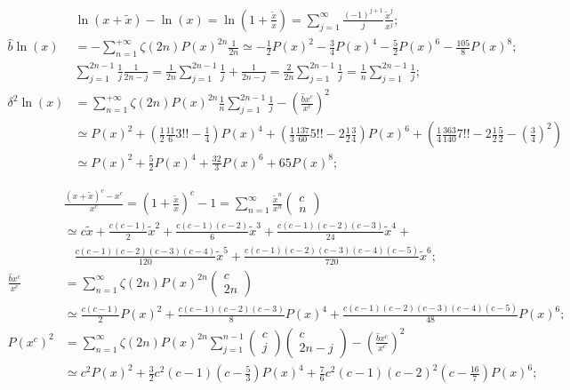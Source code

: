\documentclass[twoside]{article}
\numberwithin{equation}{section}
\newcommand{\eqspace}{\;\;\;}
\begin{document}
\begin{align*}
& \ln(x + \tilde{x}) - \ln(x) = \ln(1 + \frac{\tilde{x}}{x}) = \sum_{j=1}^{\infty} \frac{(-1)^{j+1}}{j} \frac{\tilde{x}^j}{x^j}; \\
\hat{b} \ln(x) &= -\sum_{n=1}^{+\infty} \zeta(2n) P(x)^{2n} \frac{1}{2n} 
 \simeq - \frac{1}{2} P(x)^2 - \frac{3}{4} P(x)^4 - \frac{5}{2} P(x)^6 - \frac{105}{8} P(x)^8; \\
&\sum_{j=1}^{2n-1} \frac{1}{j} \frac{1}{2n - j} = \frac{1}{2n} \sum_{j=1}^{2n-1} \frac{1}{j} +  \frac{1}{2n - j} = \frac{2}{2n} \sum_{j=1}^{2n-1} \frac{1}{j}
 = \frac{1}{n} \sum_{j=1}^{2n-1} \frac{1}{j}; \\
\delta^2 \ln(x) &= \sum_{n=1}^{+\infty} \zeta(2n) P(x)^{2n} \frac{1}{n} \sum_{j=1}^{2n-1} \frac{1}{j} - \left(\frac{\hat{b} x^c}{x^c}\right)^2 \\
 &\simeq P(x)^2 + (\frac{1}{2} \frac{11}{6} 3!! - \frac{1}{4}) P(x)^4 
  + (\frac{1}{3} \frac{137}{60} 5!! - 2 \frac{1}{2} \frac{3}{4}) P(x)^6
  + (\frac{1}{4} \frac{363}{140} 7!!- 2 \frac{1}{2} \frac{5}{2} - (\frac{3}{4})^2 ) \\
 &\simeq P(x)^2 + \frac{5}{2} P(x)^4 + \frac{32}{3} P(x)^6 + 65 P(x)^8;
\end{align*}

\begin{align*}
&\frac{(x + \tilde{x})^c - x^c}{x^c} = (1 + \frac{\tilde{x}}{x})^c - 1 = \sum_{n=1}^{\infty} \frac{\tilde{x}^n}{x^n} \begin{pmatrix} c \\ n \end{pmatrix} \\
 &\simeq c \tilde{x} + \frac{c(c-1)}{2} \tilde{x}^2 + \frac{c(c-1)(c-2)}{6} \tilde{x}^3 + \frac{c(c-1)(c-2)(c-3)}{24} \tilde{x}^4 + \\
 &\eqspace \frac{c(c-1)(c-2)(c-3)(c-4)}{120} \tilde{x}^5 + \frac{c(c-1)(c-2)(c-3)(c-4)(c-5)}{720} \tilde{x}^6; \\
\frac{\hat{b} x^c}{x^c} &= \sum_{n=1}^{\infty} \zeta(2n) P(x)^{2n} \begin{pmatrix} c \\ 2n \end{pmatrix} \\
 &\simeq \frac{c(c-1)}{2} P(x)^2 + \frac{c(c-1)(c-2)(c-3)}{8} P(x)^4 + \frac{c(c-1)(c-2)(c-3)(c-4)(c-5)}{48} P(x)^6; \\
P(x^c)^2 &= \sum_{n=1}^{\infty} \zeta(2n) P(x)^{2n} \sum_{j=1}^{n-1} \begin{pmatrix} c \\ j \end{pmatrix} \begin{pmatrix} c \\ 2n - j \end{pmatrix}
 - \left(\frac{\hat{b} x^c}{x^c}\right)^2 \\
 &\simeq c^2 P(x)^2 + \frac{3}{2} c^2 (c-1) (c - \frac{5}{3}) P(x)^4 + \frac{7}{6} c^2 (c-1) (c-2)^2 (c - \frac{16}{7}) P(x)^6;
\end{align*}
\end{document}
